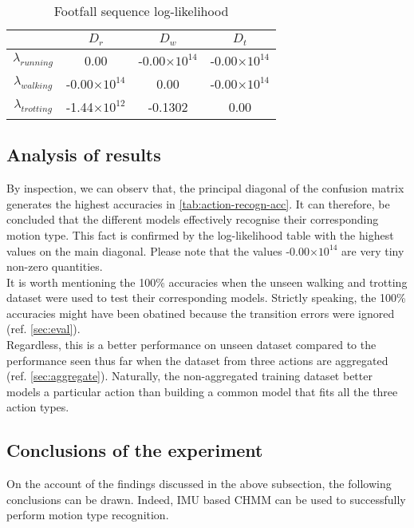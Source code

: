 \begin{table}[h!] 
	\centering
	\begin{tabular}{ |c|c|c|c|} 	
		\hline	
		& \(D_r\) &  \(D_w\) & \(D_t\)\\ 
		\hline
		\(\lambda_{running}\) & 0.00  & -0.00\(\times10^{14}\)   & -0.00\(\times10^{14}\)\\ 
		\hline
		\(\lambda_{walking}\)  & -0.00\(\times10^{14}\)  &  0.00  & -0.00\(\times10^{14}\)\\ 
		\hline
		\(\lambda_{trotting}\)  & -1.44\(\times10^{12}\)  &  -0.1302  & 0.00\\
		\hline	   	
	\end{tabular}
	\caption{Footfall sequence log-likelihood}
	\label{tab:action-recogn-log}
\end{table}

\subsection{Analysis of results}
By inspection, we can observ that, the principal diagonal of the confusion matrix generates the highest accuracies in \ref{tab:action-recogn-acc}. It can therefore, be concluded that the different models effectively recognise their corresponding motion type. This fact is confirmed by the log-likelihood table with the highest values on the main diagonal. Please note that the values -0.00\(\times10^{14}\) are very tiny non-zero quantities.\\
It is worth mentioning the 100\% accuracies when the unseen walking and trotting dataset were used to test their corresponding models. Strictly speaking, the 100\% accuracies might have been obatined because the transition errors were ignored (ref. \ref{sec:eval}). \\ Regardless, this is a better performance on unseen dataset compared to the performance seen thus far when the dataset from three actions are aggregated (ref. \ref{sec:aggregate}). Naturally, the non-aggregated training dataset better models a particular action than building a common model that fits all the three action types.

\subsection{Conclusions of the experiment}
On the account of the findings discussed in the above subsection, the following conclusions can be drawn.
Indeed, IMU based CHMM can be used to successfully perform motion type recognition. 


